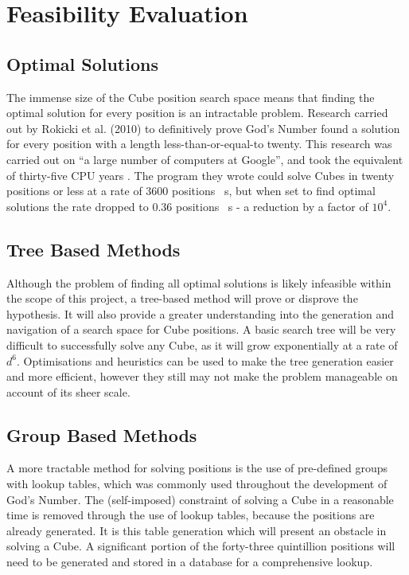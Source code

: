 \documentclass{report}
\begin{document}
    \section{Feasibility Evaluation}
    \subsection{Optimal Solutions}
    
	The immense size of the Cube position search space means that finding the optimal solution for every position is an intractable problem. Research carried out by Rokicki et al. (2010) to definitively prove God's Number found a solution for every position with a length less-than-or-equal-to twenty. This research was carried out on \enquote{a large number of computers at Google}, and took the equivalent of thirty-five CPU years \cite{Rokicki2010}. The program they wrote could solve Cubes in twenty positions or less at a rate of 3600 positions \si{\per\second}, but when set to find optimal solutions the rate dropped to 0.36 positions \si{\per\second} - a reduction by a factor of $10^4$.
    
	\subsection{Tree Based Methods}
	
	Although the problem of finding all optimal solutions is likely infeasible within the scope of this project, a tree-based method will prove or disprove the hypothesis. It will also provide a greater understanding into the generation and navigation of a search space for Cube positions. A basic search tree will be very difficult to successfully solve any Cube, as it will grow exponentially at a rate of $d^6$. Optimisations and heuristics can be used to make the tree generation easier and more efficient, however they still may not make the problem manageable on account of its sheer scale.
	
    \subsection{Group Based Methods}
    
    A more tractable method for solving positions is the use of pre-defined groups with lookup tables, which was commonly used throughout the development of God's Number. The (self-imposed) constraint of solving a Cube in a reasonable time is removed through the use of lookup tables, because the positions are already generated. It is this table generation which will present an obstacle in solving a Cube. A significant portion of the forty-three quintillion positions will need to be generated and stored in a database for a comprehensive lookup.
    
\end{document}
